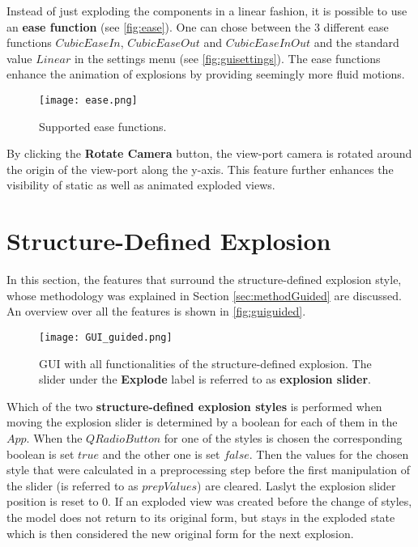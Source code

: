 \documentclass[draft,final]{vutinfth} %
\begin{document}
\par Instead of just exploding the components in a linear fashion, it is possible to use an \textbf{ease function} (see \autoref{fig:ease}). One can chose between the 3 different ease functions $Cubic Ease In$, $Cubic Ease Out$ and $Cubic Ease In Out$ and the standard value $Linear$ in the settings menu (see \autoref{fig:guisettings}). The ease functions enhance the animation of explosions by providing seemingly more fluid motions.

\begin{figure}
\centering
\texttt{[image: ease.png]}
\caption[Supported ease functions]{Supported ease functions\protect\footnotemark.}
\label{fig:ease}
\end{figure}

By clicking the \textbf{Rotate Camera} button, the view-port camera is rotated around the origin of the view-port along the y-axis. This feature further enhances the visibility of static as well as animated exploded views.

\section{Structure-Defined Explosion}
\label{sec:implGuided}

In this section, the features that surround the structure-defined explosion style, whose methodology was explained in Section \ref{sec:methodGuided} are discussed. An overview over all the features is shown in \autoref{fig:guiguided}.

\begin{figure}
\centering
\texttt{[image: GUI\_guided.png]}
\caption{GUI with all functionalities of the structure-defined explosion. The slider under the \textbf{Explode} label is referred to as \textbf{explosion slider}.}
\label{fig:guiguided}
\end{figure}

Which of the two \textbf{structure-defined explosion styles} is performed when moving the explosion slider is determined by a boolean for each of them in the $App$. When the $QRadioButton$ for one of the styles is chosen the corresponding boolean is set $true$ and the other one is set $false$. 
Then the values for the chosen style that were calculated in a preprocessing step before the first manipulation of the slider (is referred to as $prepValues$) are cleared. Laslyt the explosion slider position is reset to 0. 
If an exploded view was created before the change of styles, the model does not return to its original form, but stays in the exploded state which is then considered the new original form for the next explosion.
\end{document}
